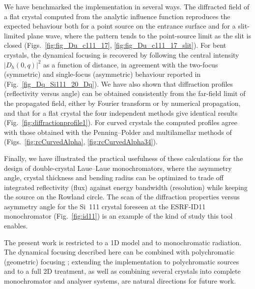 \documentclass[preprint]{iucr}              %
\begin{document}
We have benchmarked the implementation in several ways. The diffracted field of a flat crystal computed from the analytic influence function reproduces the expected behaviour both for a point source on the entrance surface and for a slit-limited plane wave, where the pattern tends to the point-source limit as the slit is closed (Figs.~\ref{fig:fig_Du_c111_17}, \ref{fig:fig_Du_c111_17_slit}). For bent crystals, the dynamical focusing is recovered by following the central intensity $|D_h(0,q)|^2$ as a function of distance, in agreement with the two-focus (symmetric) and single-focus (asymmetric) behaviour reported in \cite{GuigayFerrero2013, GuigayFerrero2016} (Fig.~\ref{fig_Dq_Si111_20_Dq}). We have also shown that diffraction profiles (reflectivity versus angle) can be obtained consistently from the far-field limit of the propagated field, either by Fourier transform or by numerical propagation, and that for a flat crystal the four independent methods give identical results (Fig.~\ref{fig:diffractionprofile1}). For curved crystals the computed profiles agree with those obtained with the Penning--Polder and multilamellar methods of \cite{codeCRYSTAL} (Figs.~\ref{fig:rcCurvedAlpha}, \ref{fig:rcCurvedAlpha34}).

Finally, we have illustrated the practical usefulness of these calculations for the design of double-crystal Laue--Laue monochromators, where the asymmetry angle, crystal thickness and bending radius can be optimized to trade off integrated reflectivity (flux) against energy bandwidth (resolution) while keeping the source on the Rowland circle. The scan of the diffraction properties versus asymmetry angle for the Si~111 crystal foreseen at the ESRF-ID11 monochromator (Fig.~\ref{fig:id11}) is an example of the kind of study this tool enables.

The present work is restricted to a 1D model and to monochromatic radiation. The dynamical focusing described here can be combined with polychromatic (geometric) focusing \cite{GuigayFerrero2013, PengQi, PengQi2021}; extending the implementation to polychromatic sources and to a full 2D treatment, as well as combining several crystals into complete monochromator and analyser systems, are natural directions for future work.



\newpage




\end{document}
